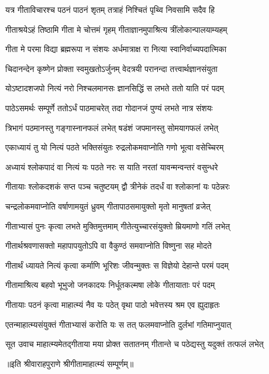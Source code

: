 \twolineshloka
{यत्र गीताविचारश्च पठनं पाठनं शृतम्}
{तत्राहं निश्चितं पृथ्वि निवसामि सदैव हि}%

\twolineshloka
{गीताश्रयेऽहं तिष्ठामि गीता मे चोत्तमं गृहम्}
{गीताज्ञानमुपाश्रित्य त्रींलोकान्पालयाम्यहम्}%

\twolineshloka
{गीता मे परमा विद्या ब्रह्मरूपा न संशयः}
{अर्धमात्राक्ष रा नित्या स्वानिर्वाच्यपदात्मिका}%

\twolineshloka
{चिदानन्देन कृष्णेन प्रोक्ता स्वमुखतोऽर्जुनम्}
{वेदत्रयी परानन्दा तत्त्वार्थज्ञानसंयुता}%

\twolineshloka
{योऽष्टादशजपो नित्यं नरो निश्चलमानसः}
{ज्ञानसिद्धिं स लभते ततो याति परं पदम्}%

\twolineshloka
{पाठेऽसमर्थः सम्पूर्णे ततोऽर्धं पाठमाचरेत्}
{तदा गोदानजं पुण्यं लभते नात्र संशयः}%

\twolineshloka
{त्रिभागं पठमानस्तु गङ्गास्नानफलं लभेत्}
{षडंशं जपमानस्तु सोमयागफलं लभेत्}%

\twolineshloka
{एकाध्यायं तु यो नित्यं पठते भक्तिसंयुतः}
{रुद्रलोकमवाप्नोति गणो भूत्वा वसेच्चिरम्}%

\twolineshloka
{अध्यायं श्लोकपादं वा नित्यं यः पठते नरः}
{स याति नरतां यावन्मन्वन्तरं वसुन्धरे}%

\twolineshloka
{गीतायाः श्लोकदशकं सप्त पञ्च चतुष्टयम्}
{द्वौ त्रीनेकं तदर्धं वा श्लोकानां यः पठेन्नरः}%

\twolineshloka
{चन्द्रलोकमवाप्नोति वर्षाणामयुतं ध्रुवम्}
{गीतापाठसमायुक्तो मृतो मानुषतां व्रजेत्}%

\twolineshloka
{गीताभ्यासं पुनः कृत्वा लभते मुक्तिमुत्तमाम्}
{गीतेत्युच्चारसंयुक्तो म्रियमाणो गतिं लभेत्}%

\twolineshloka
{गीतार्थश्रवणासक्तो महापापयुतोऽपि वा}
{वैकुण्ठं समवाप्नोति विष्णुना सह मोदते}%

\twolineshloka
{गीतार्थं ध्यायते नित्यं कृत्वा कर्माणि भूरिशः}
{जीवन्मुक्तः स विज्ञेयो देहान्ते परमं पदम्}%

\twolineshloka
{गीतामाश्रित्य बहवो भूभुजो जनकादयः}
{निर्धूतकल्मषा लोके गीतायाताः परं पदम्}%

\twolineshloka
{गीतायाः पठनं कृत्वा माहात्म्यं नैव यः पठेत्}
{वृथा पाठो भवेत्तस्य श्रम एव ह्युदाहृतः}%

\twolineshloka
{एतन्माहात्म्यसंयुक्तं गीताभ्यासं करोति यः}
{स तत् फलमवाप्नोति दुर्लभां गतिमाप्नुयात्}%

{सूत उवाच}
\twolineshloka
{माहात्म्यमेतद्गीताया मया प्रोक्त सतातनम्}
{गीतान्ते च पठेद्यस्तु यदुक्तं तत्फलं लभेत्}%

{॥इति श्रीवाराहपुराणे श्रीगीतामाहात्म्यं सम्पूर्णम्॥}
\clearpage